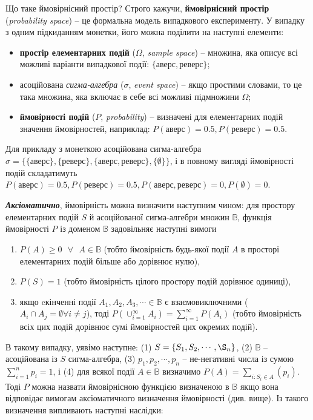 \documentclass[
  11pt,
]{book}
\begin{document}
Що таке ймовірнісний простір? Строго кажучи, \textbf{ймовірнісний простір} (\emph{probability space}) -- це формальна модель випадкового експерименту. У випадку з одним підкиданням монетки, його можна поділити на наступні елементи:

\begin{itemize}
\item
  \textbf{простір елементарних подій} (\(\Omega\), \emph{sample space}) -- множина, яка описує всі можливі варіанти випадкової події: \(\{аверс, реверс\}\);
\item
  асоційована \emph{сигма-алгебра} (\(\sigma\), \emph{event space}) -- якщо простими словами, то це така множина, яка включає в себе всі можливі підмножини \(\Omega\);
\item
  \textbf{ймовірності подій} (\(P\), \emph{probability}) -- визначені для елементарних подій значення ймовірностей, наприклад: \(P(аверс) = 0.5, P(реверс) = 0.5\).
\end{itemize}

Для прикладу з монеткою асоційована сигма-алгебра \(\sigma = \{\{аверс\}, \{реверс\}, \{аверс, реверс\}, \{\emptyset\}\}\), і в повному вигляді ймовірності подій складатимуть \(P(аверс) = 0.5, P(реверс) = 0.5, P({аверс, реверс}) = 0, P(\emptyset) = 0\).

\textbf{\emph{Аксіоматично}}, ймовірність можна визначити наступним чином: для простору елементарних подій \(S\) й асоційованої сигма-алгебри множин \(\mathbb{B}\), функція ймовірності \(P\) із доменом \(\mathbb{B}\) задовільняє наступні вимоги

\begin{enumerate}
\def\labelenumi{\arabic{enumi}.}
\item
  \(P(A) \geq 0 \text{ } \forall \text{ } A \in \mathbb{B}\) (тобто ймовірність будь-якої події \(A\) в просторі елементарних подій більше або дорівнює нулю),
\item
  \(P(S) = 1\) (тобто ймовірність цілого простору подій дорівнює одиниці),
\item
  якщо cкінченні події \(A_1, A_2, A_3, \cdots \in \mathbb{B}\) є взаємовиключними (\(A_i \cap A_j = \emptyset \forall i \neq j\)), тоді \(P(\cup_{i=1}^{\infty} A_i) = \sum_{i=1}^{\infty} P(A_i)\) (тобто ймовірність всіх цих подій дорівнює сумі ймовірностей цих окремих подій).
\end{enumerate}

В такому випадку, уявімо наступне: (1) \(S = \{S_1, S_2, \cdots, \S_n\}\), (2) \(\mathbb{B}\) -- асоційована із \(S\) сигма-алгебра, (3) \(p_1, p_2, \cdots, p_n\) -- не-негативні числа із сумою \(\sum_{i=1}^n p_i = 1\), і (4) для всякої події \(A \in \mathbb{B}\) визначимо \(P(A) = \sum_{i:S_i \in A}(p_i)\). Тоді \(P\) можна назвати ймовірнісною функцією визначеною в \(\mathbb{B}\) якщо вона відповідає вимогам аксіоматичного визначення ймовірності (див. вище). Із такого визначення випливають наступні наслідки:
\end{document}
